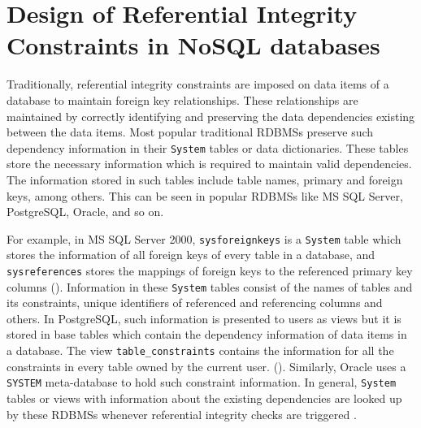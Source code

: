 \chapter{Design of Referential Integrity Constraints in NoSQL
databases} \label{c:solutions}

Traditionally,  referential
integrity constraints are imposed on data items of a database to maintain
foreign key relationships.   These relationships are
 maintained by correctly identifying and preserving the data dependencies 
 existing between the data items.  
Most popular traditional \acp{RDBMS}
preserve such dependency information in their \texttt{System} tables or data
dictionaries.    These tables store the necessary information  which is required
to maintain valid dependencies.   The information stored in such tables include table
names,   primary and foreign keys, among others.  
This can be seen in popular \acp{RDBMS} like  MS SQL Server,   PostgreSQL, 
Oracle,  and so on.    

For example,   in MS SQL Server 2000,  \texttt{sysforeignkeys}
is a \texttt{System} table which stores the information of all 
foreign keys of every table in a database,  and \texttt{sysreferences}
stores the mappings of  foreign keys to the referenced primary key columns
().  
Information in these \texttt{System} tables consist of  the
names of tables and its constraints,   unique identifiers of 
referenced and referencing columns and others.   
In PostgreSQL,  such information is presented to users as views but it is stored
in base tables which contain the dependency information of data items in a database. 
The view \texttt{table\_constraints} contains the information for all the
constraints in every table owned by the current user.   (\todo{\cite{}}).   
Similarly,  Oracle uses a \texttt{SYSTEM} meta-database to hold such constraint
information.  
 In general,  \texttt{System} tables or views with information
about the existing dependencies  are looked up by these \acp{RDBMS} whenever
referential integrity checks are triggered \citep{sys:msdn}.  


